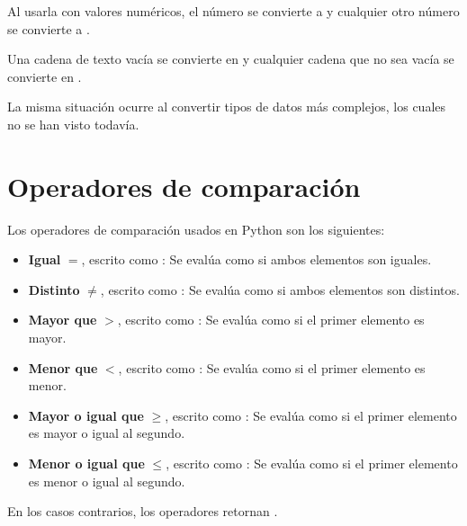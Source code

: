 Al usarla con valores numéricos, el número  se convierte a  y cualquier otro número se convierte a .


Una cadena de texto vacía se convierte en  y cualquier cadena que no sea vacía se convierte en .


La misma situación ocurre al convertir tipos de datos más complejos, los cuales no se han visto todavía.


\section{Operadores de comparación}

Los operadores de comparación usados en Python son los siguientes:

\begin{itemize}
  \item \textbf{Igual} $=$, escrito como \ttt{==}: Se evalúa como  si ambos elementos son iguales.
  
  \item \textbf{Distinto} $\neq$, escrito como \ttt{!=}: Se evalúa como  si ambos elementos son distintos.
  
  \item \textbf{Mayor que} $>$, escrito como \ttt{>}: Se evalúa como  si el primer elemento es mayor.
  
  \item \textbf{Menor que} $<$, escrito como \ttt{<}: Se evalúa como  si el primer elemento es menor.
  
  \item \textbf{Mayor o igual que} $\geq$, escrito como \ttt{>=}: Se evalúa como  si el primer elemento es mayor o igual al segundo.
  
  \item \textbf{Menor o igual que} $\leq$, escrito como \ttt{<=}: Se evalúa como  si el primer elemento es menor o igual al segundo.
  
\end{itemize}

En los casos contrarios, los operadores retornan .
\medskip

